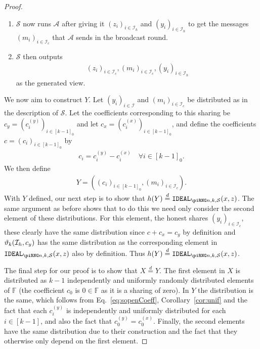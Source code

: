 \documentclass{article}
\newcommand{\eqd}[0]{\stackrel{d}{=}}
\newcommand{\seq}[1]{\left[#1\right]}
\newcommand{\seqZ}[1]{\left[#1\right]_0}
\theoremstyle{remark}
\newcommand{\F}{\mathbb{F}}
\begin{document}
\begin{proof}
\begin{enumerate}
		\item\label{enum:openMsg} $\mathcal{S}$ now runs $\mathcal{A}$ after
			giving it ${(z_i)}_{i \in \mathcal{I}_h}$ and ${(y_i)}_{i \in
			\mathcal{I}_h}$ to get the messages ${(m_i)}_{i \in \mathcal{I}_c}$
			that $\mathcal{A}$ sends in the broadcast round.

		\item $\mathcal{S}$ then outputs
			\begin{align*}
				{(z_i)}_{i \in \mathcal{I}_c},
				{(m_i)}_{i \in \mathcal{I}_c},
				{(y_i)}_{i \in \mathcal{I}_h}
			\end{align*}
			as the generated view.
	\end{enumerate}

	We now aim to construct $Y$. Let ${(y_i)}_{i \in \mathcal{I}}$ and
	${(m_i)}_{i \in \mathcal{I}_c}$ be distributed as in the description of
	$\mathcal{S}$. Let the coefficients corresponding to this sharing be $c_y =
	{(c_i^{(y)})}_{i \in \seqZ{k-1}}$ and let $c_x = {(c_i^{(x)})}_{i \in
	\seqZ{k-1}}$, and define the coefficients $c = {(c_i)}_{i \in \seqZ{k-1}}$
	by
	\begin{align}\label{eq:sopenCoeff}
		c_i = c_i^{(y)} - c_i^{(x)} \quad \forall i \in \seqZ{k-1}.
	\end{align}
	We then define
	\begin{align*}
		Y
		=
		\left(
			{(c_i)}_{i \in \seqZ{k-1}},
			{(m_i)}_{i \in \mathcal{I}_c}
		\right).
	\end{align*}
	With $Y$ defined, our next step is to show that $h(Y) \eqd \idealD$. The
	same argument as before shows that to do this we need only consider the
	second element of these distributions. For this element, the honest shares
	${(y_i)}_{i \in \mathcal{I}_c}$, these clearly have the same distribution
	since $c + c_x = c_y$ by definition and $\vartheta_{k}(\mathcal{I}_h, c_y)$ has the
	same distribution as the corresponding element in $\idealD$ also by
	definition. Thus $h(Y) \eqd \idealD$.

	The final step for our proof is to show that $X \eqd Y$. The first element
	in $X$ is distributed as $k-1$ independently and uniformly randomly
	distributed elements of $\F$ (the coefficient $c_0$ is $0 \in \F$ as it is
	a sharing of zero). In $Y$ the distribution is the same, which follows from
	Eq.~\eqref{eq:sopenCoeff}, Corollary~\ref{cor:unif} and the fact that each
	$c_i^{(y)}$ is independently and uniformly distributed for each $i \in
	\seq{k-1}$, and also the fact that $c_0^{(y)} = c_0^{(x)}$. Finally, the
	second elements have the same distribution due to their construction and
	the fact that they otherwise only depend on the first element.
\end{proof}
\end{document}
